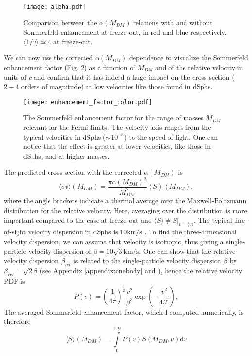 \begin{figure}[htbp]
	\centering
	\texttt{[image: alpha.pdf]}
	\caption{Comparison between the \(\alpha (M_{DM} )\) relations with and without Sommerfeld enhancement at freeze-out, in red and blue respectively. \(\langle 1 / v \rangle \simeq 4 \) at freeze-out.}
	\label{fig:alpha}
\end{figure}

We can now use the corrected \(\alpha (M_{DM} )\) dependence to visualize the Sommerfeld enhancement factor (Fig. \ref{fig:enhancement_factor}) as a function of \(M_{DM} \) and of the relative velocity in units of \(c\) and confirm that it has indeed a huge impact on the cross-section (\(2-4\) orders of magnitude) at low velocities like those found in dSphs.

\begin{figure}[htbp]
	\centering
	\texttt{[image: enhancement\_factor\_color.pdf]}
	\caption{The Sommerfeld enhancement factor for the range of masses \(M_{DM} \) relevant for the Fermi limits. The velocity axis ranges from the typical velocities in dSphs (\(\sim 10^{-5} \)) to the speed of light. One can notice that the effect is greater at lower velocities, like those in dSphs, and at higher masses.}
	\label{fig:enhancement_factor}
\end{figure}

The predicted cross-section with the corrected \(\alpha (M_{DM} )\) is
\begin{equation}\label{eq:sigma_enhanced}
	\langle \sigma v \rangle (M_{DM} )= \frac{\pi \alpha (M_{DM} )^2}{M_{DM} ^2} \left \langle S \right \rangle(M_{DM} ),
\end{equation}
where the angle brackets indicate a thermal average over the Maxwell-Boltzmann distribution for the relative velocity. Here, averaging over the distribution is more important compared to the case at freeze-out and \(\langle S \rangle \neq S|_{v= \langle v \rangle }\). The typical line-of-sight velocity dispersion in dSphs is \(10 \mathrm{km / s} \) \cite{Walker_2013, Arkani_2009}. To find the three-dimensional velocity dispersion, we can assume that velocity is isotropic, thus giving a single-particle velocity dispersion of \(\beta = 10 \sqrt{3} \mathrm{km / s} \). One can show that the relative velocity dispersion \(\beta_{rel} \) is related to the single-particle velocity dispersion \(\beta \) by \(\beta _{rel} = \sqrt{2} \beta \) (see Appendix \ref{appendix:onebody} and \cite{Ferrer_2013}), hence the relative velocity PDF is
\begin{equation}
	P(v ) = \left( \frac{1}{4\pi } \right)^\frac{1}{2} \frac{v ^2}{\beta ^3} \exp \left( -\frac{v ^2}{4 \beta ^2} \right),
\end{equation}
The averaged Sommerfeld enhancement factor, which I computed numerically, is therefore
\begin{equation}
	\langle S \rangle (M_{DM} ) = \int\limits_0^{+ \infty } P(v ) S(M_{DM}, v ) \mathrm{d} v
\end{equation}



